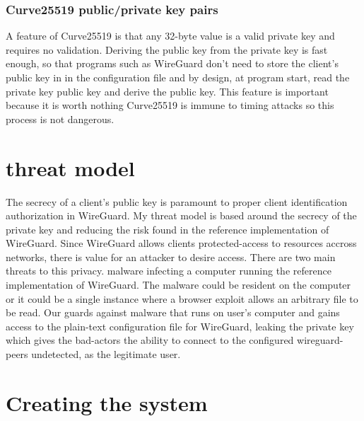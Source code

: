 \documentclass [11pt, proquest] {uwthesis}[2020/02/24]
\begin{document}
\subsection{Curve25519 public/private key pairs}
A feature of Curve25519 is that any 32-byte value is a valid private key and requires no validation.  Deriving the public key from the private key is fast enough, so that programs such as WireGuard don't need to store the client's public key in in the configuration file and by design, at program start, read the private key public key and derive the public key. This feature is important because it is worth nothing Curve25519 is immune to timing attacks so this process is not dangerous.\cite{noauthor_safecurves_2022}

\chapter {threat model}
\label{section:tm}

The secrecy of a client's public key is paramount to proper client identification authorization in WireGuard. 
My threat model is based around the secrecy of the private key and reducing the risk found in the reference implementation of WireGuard. Since WireGuard allows clients protected-access to resources accross networks, there is value for an attacker to desire access. 
There are two main threats to this privacy.  malware infecting a computer running the reference implementation of WireGuard. The malware could be resident on the computer or it could be a single instance where a browser exploit allows an arbitrary file to be read. Our guards against malware that runs on user's computer and gains access to the plain-text configuration file for WireGuard, leaking the private key which gives the bad-actors the ability to connect to the configured wireguard-peers undetected, as the legitimate user.


\chapter {Creating the system}
\end{document}
